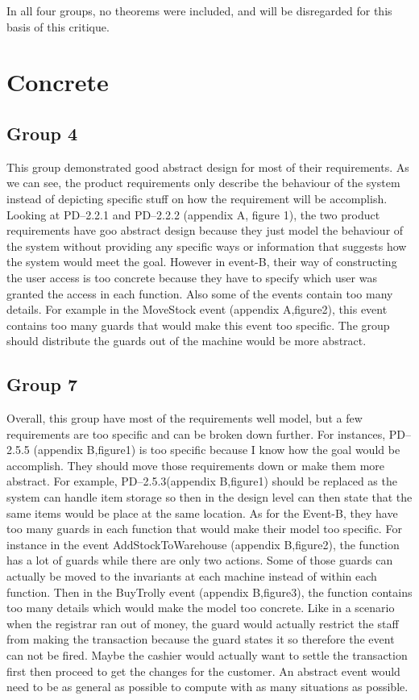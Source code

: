 In all four groups, no theorems were included, and will be disregarded for this basis of this critique.

\section{Concrete}
\label{concrete}

\subsection{Group 4}
\label{group4}

This group demonstrated good abstract design for most of their requirements. As we can see, the product requirements only describe the behaviour of the system instead of depicting specific stuff on how the requirement will be accomplish. Looking at PD--2.2.1 and PD--2.2.2 (appendix A, figure 1), the two product requirements have goo abstract design because they just model the behaviour of the system without providing any specific ways or information that suggests how the system would meet the goal. However in event-B, their way of constructing the user access is too concrete because they have to specify which user was granted the access in each function. Also some of the events contain too many details. For example in the MoveStock event (appendix A,figure2), this event contains too many guards that would make this event too specific. The group should distribute the guards out of the machine would be more abstract. 

\subsection{Group 7}
\label{group7}

Overall, this group have most of the requirements well model, but a few requirements are too specific and can be broken down further. For instances, PD--2.5.5 (appendix B,figure1) is too specific because I know how the goal would be accomplish. They should move those requirements down or make them more abstract. For example, PD--2.5.3(appendix B,figure1) should be replaced as the system can handle item storage so then in the design level can then state that the same items would be place at the same location. As for the Event-B, they have too many guards in each function that would make their model too specific. For instance in the event AddStockToWarehouse (appendix B,figure2), the function has a lot of guards while there are only two actions. Some of those guards can actually be moved to the invariants at each machine instead of within each function. Then in the BuyTrolly event (appendix B,figure3), the function contains too many details which would make the model too concrete. Like in a scenario when the registrar ran out of money, the guard would actually restrict the staff from making the transaction because the guard states it so therefore the event can not be fired. Maybe the cashier would actually want to settle the transaction first then proceed to get the changes for the customer. An abstract event would need to be as general as possible to compute with as many situations as possible. 

